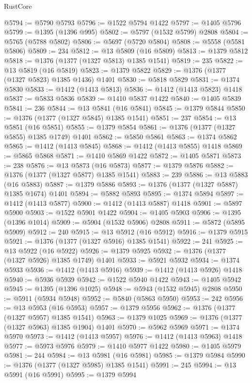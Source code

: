 \begin{lexlean}{RustCore}
\begin{coremodule}
@5794 := @5790 @5793
@5796 := @1522 @5794 @1422
@5797 := @1405 @5796
@5799 := @1395 (@1396 @995)
@5802 := @5797 (@1532 @5799) @2808
@5804 := @5765 (@5788 @5802)
@5806 := @5697 (@5720 @5804)
@5808 := @5558 (@5581 @5806)
@5809 := 234
@5812 := @13 @5809 (@16 @5809)
@5813 := @1379 @5812
@5818 := @1376 (@1377 (@1327 @5813) @1385 @1541)
@5819 := 235
@5822 := @13 @5819 (@16 @5819)
@5823 := @1379 @5822
@5829 := @1376 (@1377 (@1327 @5823) @1385 @1436) @1401
@5830 := @5818 @5829
@5831 := @1374 @5830
@5833 := @1412 (@1413 @5813)
@5836 := @1412 (@1413 @5823) @1418
@5837 := @5833 @5836
@5839 := @1410 @5837 @1422
@5840 := @1405 @5839
@5841 := 236
@5844 := @13 @5841 (@16 @5841)
@5845 := @1379 @5844
@5850 := @1376 (@1377 (@1327 @5845) @1385 @1541)
@5851 := 237
@5854 := @13 @5851 (@16 @5851)
@5855 := @1379 @5854
@5861 := @1376 (@1377 (@1327 @5855) @1385 @1749) @1401
@5862 := @5850 @5861
@5863 := @1374 @5862
@5865 := @1412 (@1413 @5845)
@5868 := @1412 (@1413 @5855) @1418
@5869 := @5865 @5868
@5871 := @1410 @5869 @1422
@5872 := @1405 @5871
@5873 := 238
@5876 := @13 @5873 (@16 @5873)
@5877 := @1379 @5876
@5882 := @1376 (@1377 (@1327 @5877) @1385 @1541)
@5883 := 239
@5886 := @13 @5883 (@16 @5883)
@5887 := @1379 @5886
@5893 := @1376 (@1377 (@1327 @5887) @1385 @1674) @1401
@5894 := @5882 @5893
@5895 := @1374 @5894
@5897 := @1412 (@1413 @5877)
@5900 := @1412 (@1413 @5887) @1418
@5901 := @5897 @5900
@5903 := @1522 @5901 @1422
@5904 := @1405 @5903
@5906 := @1395 (@1396 @1014)
@5909 := @5904 (@1532 @5906) @2808
@5911 := @5872 (@5895 @5909)
@5912 := 240
@5915 := @13 @5912 (@16 @5912)
@5916 := @1379 @5915
@5921 := @1376 (@1377 (@1327 @5916) @1385 @1541)
@5922 := 241
@5925 := @13 @5922 (@16 @5922)
@5926 := @1379 @5925
@5932 := @1376 (@1377 (@1327 @5926) @1385 @1749) @1401
@5933 := @5921 @5932
@5934 := @1374 @5933
@5936 := @1412 (@1413 @5916)
@5939 := @1412 (@1413 @5926) @1418
@5940 := @5936 @5939
@5942 := @1522 @5940 @1422
@5943 := @1405 @5942
@5945 := @1395 (@1396 @1025)
@5948 := @5943 (@1532 @5945) @2808
@5950 := @5911 (@5934 @5948)
@5952 := @5840 (@5863 @5950)
@5953 := 242
@5956 := @13 @5953 (@16 @5953)
@5957 := @1379 @5956
@5962 := @1376 (@1377 (@1327 @5957) @1385 @1541)
@5963 := @1379 @1025
@5969 := @1376 (@1377 (@1327 @5963) @1385 @1904) @1401
@5970 := @5962 @5969
@5971 := @1374 @5970
@5973 := @1412 (@1413 @5957)
@5976 := @1412 (@1413 @5963) @1418
@5977 := @5973 @5976
@5979 := @1410 @5977 @1422
@5980 := @1405 @5979
@5981 := 244
@5984 := @13 @5981 (@16 @5981)
@5985 := @1379 @5984
@5990 := @1376 (@1377 (@1327 @5985) @1385 @1541)
@5991 := 245
@5994 := @13 @5991 (@16 @5991)
@5995 := @1379 @5994

\end{coremodule}
\end{lexlean}
